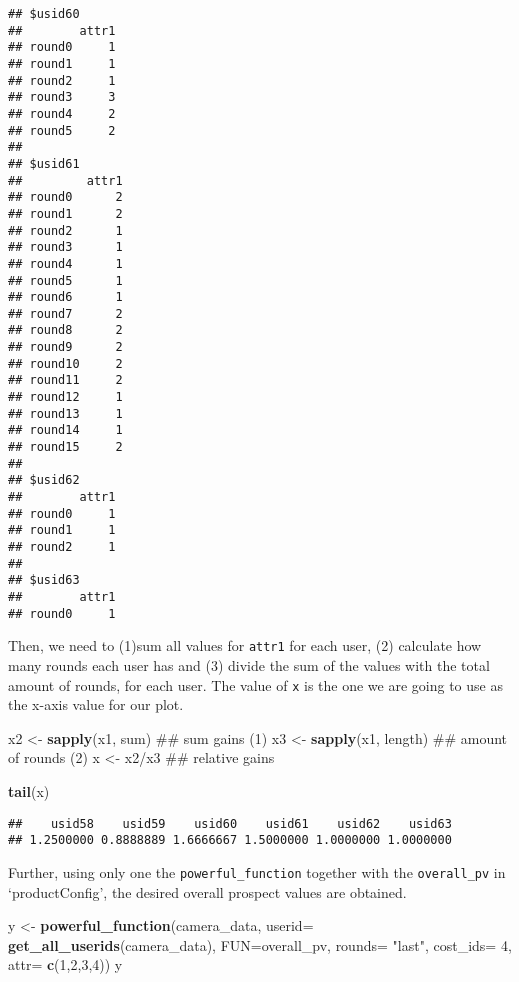 \documentclass[]{article}
\newenvironment{Shaded}{\begin{snugshade}}{\end{snugshade}}
\newcommand{\KeywordTok}[1]{\textcolor[rgb]{0.13,0.29,0.53}{\textbf{{#1}}}}
\newcommand{\DataTypeTok}[1]{\textcolor[rgb]{0.13,0.29,0.53}{{#1}}}
\newcommand{\DecValTok}[1]{\textcolor[rgb]{0.00,0.00,0.81}{{#1}}}
\newcommand{\StringTok}[1]{\textcolor[rgb]{0.31,0.60,0.02}{{#1}}}
\newcommand{\NormalTok}[1]{{#1}}
\begin{document}
\begin{verbatim}
## $usid60
##        attr1
## round0     1
## round1     1
## round2     1
## round3     3
## round4     2
## round5     2
## 
## $usid61
##         attr1
## round0      2
## round1      2
## round2      1
## round3      1
## round4      1
## round5      1
## round6      1
## round7      2
## round8      2
## round9      2
## round10     2
## round11     2
## round12     1
## round13     1
## round14     1
## round15     2
## 
## $usid62
##        attr1
## round0     1
## round1     1
## round2     1
## 
## $usid63
##        attr1
## round0     1
\end{verbatim}

Then, we need to (1)sum all values for \texttt{attr1} for each user, (2)
calculate how many rounds each user has and (3) divide the sum of the
values with the total amount of rounds, for each user. The value of
\texttt{x} is the one we are going to use as the x-axis value for our
plot.

\begin{Shaded}
\begin{Highlighting}[]
\NormalTok{x2 <-}\StringTok{ }\KeywordTok{sapply}\NormalTok{(x1, sum)     ## sum gains (1)}
\NormalTok{x3 <-}\StringTok{ }\KeywordTok{sapply}\NormalTok{(x1, length)  ## amount of rounds (2)}
\NormalTok{x <-}\StringTok{ }\NormalTok{x2/x3                ## relative gains}
\end{Highlighting}
\end{Shaded}

\begin{Shaded}
\begin{Highlighting}[]
\KeywordTok{tail}\NormalTok{(x)}
\end{Highlighting}
\end{Shaded}

\begin{verbatim}
##    usid58    usid59    usid60    usid61    usid62    usid63 
## 1.2500000 0.8888889 1.6666667 1.5000000 1.0000000 1.0000000
\end{verbatim}

Further, using only one the \texttt{powerful\_function} together with
the \texttt{overall\_pv} in `productConfig', the desired overall
prospect values are obtained.

\begin{Shaded}
\begin{Highlighting}[]
\NormalTok{y <-}\StringTok{ }\KeywordTok{powerful_function}\NormalTok{(camera_data, }\DataTypeTok{userid=} \KeywordTok{get_all_userids}\NormalTok{(camera_data), }
                       \DataTypeTok{FUN=}\NormalTok{overall_pv, }
                       \DataTypeTok{rounds=} \StringTok{"last"}\NormalTok{,}
                       \DataTypeTok{cost_ids=} \DecValTok{4}\NormalTok{, }
                       \DataTypeTok{attr=} \KeywordTok{c}\NormalTok{(}\DecValTok{1}\NormalTok{,}\DecValTok{2}\NormalTok{,}\DecValTok{3}\NormalTok{,}\DecValTok{4}\NormalTok{))}
\NormalTok{y}
\end{Highlighting}
\end{Shaded}
\end{document}
